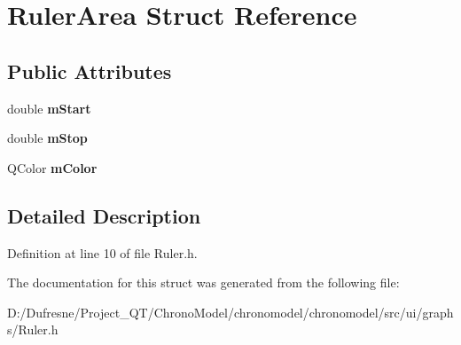 \hypertarget{struct_ruler_area}{\section{Ruler\-Area Struct Reference}
\label{struct_ruler_area}
}
\subsection*{Public Attributes}
\begin{DoxyCompactItemize}
\item 
\hypertarget{struct_ruler_area_a3eb227ac7182c78b32e183bad2fb5432}{double {\bfseries m\-Start}}\label{struct_ruler_area_a3eb227ac7182c78b32e183bad2fb5432}

\item 
\hypertarget{struct_ruler_area_ab6bcdef8a4ae837b4d78e36d9a91f624}{double {\bfseries m\-Stop}}\label{struct_ruler_area_ab6bcdef8a4ae837b4d78e36d9a91f624}

\item 
\hypertarget{struct_ruler_area_a511fa015d93b28cb8e9011bdb0448064}{Q\-Color {\bfseries m\-Color}}\label{struct_ruler_area_a511fa015d93b28cb8e9011bdb0448064}

\end{DoxyCompactItemize}


\subsection{Detailed Description}


Definition at line 10 of file Ruler.\-h.



The documentation for this struct was generated from the following file\-:\begin{DoxyCompactItemize}
\item 
D\-:/\-Dufresne/\-Project\-\_\-\-Q\-T/\-Chrono\-Model/chronomodel/chronomodel/src/ui/graphs/Ruler.\-h\end{DoxyCompactItemize}

